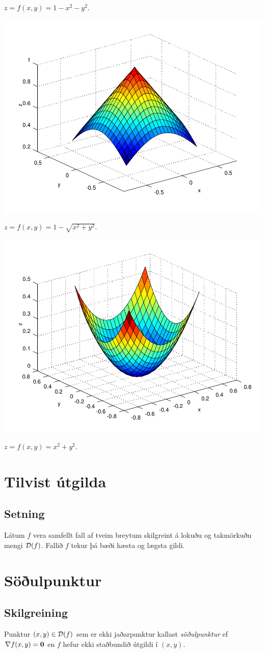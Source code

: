 \documentclass[a4paper,10pt,icelandic]{sphinxmanual}
\begin{document}
\(z = f(x,y) = 1-x^2-y^2\).

{\hfill\includegraphics[width=0.600\linewidth]{peak.png}\hfill}

\(z = f(x,y) = 1-\sqrt{x^2+y^2}\).

{\hfill\includegraphics[width=0.600\linewidth]{max_bound.png}\hfill}

\(z= f(x,y) = x^2+y^2\).


\section{Tilvist útgilda}
\label{Kafli3:tilvist-utgilda}

\subsection{Setning}
\label{Kafli3:id1}
Látum \(f\) vera samfellt fall af tveim breytum skilgreint á lokuðu
og takmörkuðu mengi \({\cal D}(f)\). Fallið \(f\) tekur þá bæði
hæsta og lægsta gildi.


\section{Söðulpunktur}
\label{Kafli3:index-2}\label{Kafli3:soulpunktur}

\subsection{Skilgreining}
\label{Kafli3:id2}
Punktur \((x,y)\in  {\cal D}(f)\) sem er ekki jaðarpunktur kallast
\textit{söðulpunktur} ef \(\nabla f(x,y)=\mbox{${\bf 0}$}\) en \(f\)
hefur ekki staðbundið útgildi í \((x,y)\).
\end{document}
